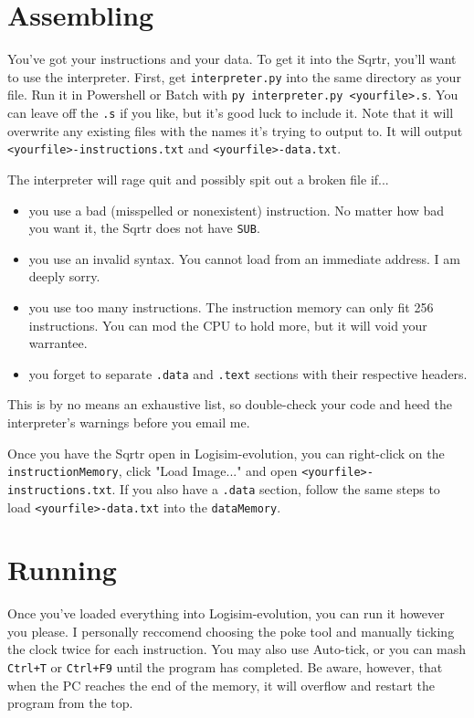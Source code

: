 \documentclass[12pt, oneside]{memoir}
\newcommand{\instruction}[1]{{\color{instruction}\texttt{#1}}}
\newcommand{\header}[1]{{\color{header}\texttt{#1}}}
\begin{document}
\chapter{Assembling}
\label{s2}
You've got your instructions and your data. To get it into the Sqrtr, you'll want to use the interpreter. First, get \texttt{interpreter.py} into the same directory as your file. Run it in Powershell or Batch with \texttt{py interpreter.py <yourfile>.s}. You can leave off the \texttt{.s} if you like, but it's good luck to include it. Note that it will overwrite any existing files with the names it's trying to output to. It will output \texttt{<yourfile>-instructions.txt} and \texttt{<yourfile>-data.txt}.

The interpreter will rage quit and possibly spit out a broken file if...
\begin{itemize}
    \item you use a bad (misspelled or nonexistent) instruction. No matter how bad you want it, the Sqrtr does not have \instruction{SUB}.
    \item you use an invalid syntax. You cannot load from an immediate address. I am deeply sorry.
    \item you use too many instructions. The instruction memory can only fit 256 instructions. You can mod the CPU to hold more, but it will void your warrantee.
    \item you forget to separate \header{.data} and \header{.text} sections with their respective headers.
\end{itemize}

This is by no means an exhaustive list, so double-check your code and heed the interpreter's warnings before you email me.

Once you have the Sqrtr open in Logisim-evolution, you can right-click on the \texttt{instructionMemory}, click "Load Image..." and open \texttt{<yourfile>-instructions.txt}. If you also have a \header{.data} section, follow the same steps to load \texttt{<yourfile>-data.txt} into the \texttt{dataMemory}.

\chapter{Running}
Once you've loaded everything into Logisim-evolution, you can run it however you please. I personally reccomend choosing the poke tool and manually ticking the clock twice for each instruction. You may also use Auto-tick, or you can mash \texttt{Ctrl+T} or \texttt{Ctrl+F9} until the program has completed. Be aware, however, that when the PC reaches the end of the memory, it will overflow and restart the program from the top. 
\end{document}
